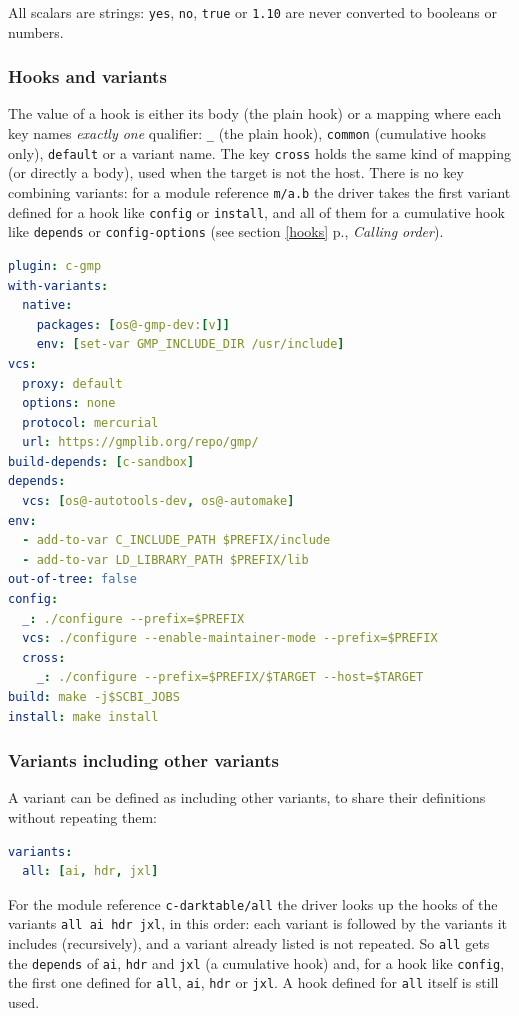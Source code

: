 \documentclass[a4paper,12pt,twoside]{article}
\newcommand{\code}[1]{\texttt{#1}}
\renewcommand{\emph}[1]{\textit{#1}}
\newcommand{\seeref}[1]{see section \ref{#1} p.\pageref{#1}}
\begin{document}
All scalars are strings: \code{yes}, \code{no}, \code{true} or
\code{1.10} are never converted to booleans or numbers.

\subsubsection{Hooks and variants}

The value of a hook is either its body (the plain hook) or a mapping where each key names \emph{exactly one} qualifier:
\code{\_} (the plain hook), \code{common} (cumulative hooks only),
\code{default} or a variant name. The key \code{cross} holds the same kind of
mapping (or directly a body), used when the target is not the host. There is
no key combining variants: for a module reference \code{m/a.b} the driver
takes the first variant defined for a hook like \code{config} or
\code{install}, and all of them for a cumulative hook like \code{depends}
or \code{config-options} (\seeref{hooks}, \emph{Calling order}).

\begin{lstlisting}[language=yaml]
plugin: c-gmp
with-variants:
  native:
    packages: [os@-gmp-dev:[v]]
    env: [set-var GMP_INCLUDE_DIR /usr/include]
vcs:
  proxy: default
  options: none
  protocol: mercurial
  url: https://gmplib.org/repo/gmp/
build-depends: [c-sandbox]
depends:
  vcs: [os@-autotools-dev, os@-automake]
env:
  - add-to-var C_INCLUDE_PATH $PREFIX/include
  - add-to-var LD_LIBRARY_PATH $PREFIX/lib
out-of-tree: false
config:
  _: ./configure --prefix=$PREFIX
  vcs: ./configure --enable-maintainer-mode --prefix=$PREFIX
  cross:
    _: ./configure --prefix=$PREFIX/$TARGET --host=$TARGET
build: make -j$SCBI_JOBS
install: make install
\end{lstlisting}

\subsubsection{Variants including other variants}
\label{yaml-variants}

A variant can be defined as including other variants, to share their
definitions without repeating them:

\begin{lstlisting}[language=yaml]
variants:
  all: [ai, hdr, jxl]
\end{lstlisting}

For the module reference \code{c-darktable/all} the driver looks up the
hooks of the variants \code{all ai hdr jxl}, in this order: each variant
is followed by the variants it includes (recursively), and a variant
already listed is not repeated. So \code{all} gets the \code{depends} of
\code{ai}, \code{hdr} and \code{jxl} (a cumulative hook) and, for a hook
like \code{config}, the first one defined for \code{all}, \code{ai},
\code{hdr} or \code{jxl}. A hook defined for \code{all} itself is still
used.
\end{document}
